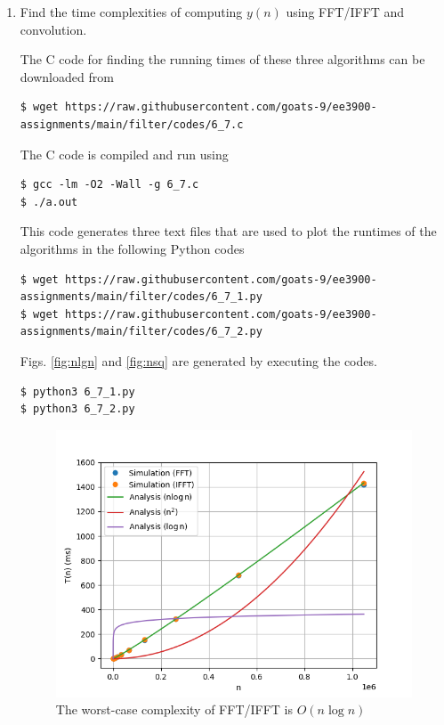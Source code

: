 \documentclass[journal,12pt,twocolumn]{IEEEtran}
\renewcommand\thesection{\arabic{section}}
\begin{document}
\begin{enumerate}[label=\thesection.\arabic*]
\item Find the time complexities of computing $y(n)$ using FFT/IFFT and convolution.

\solution The C code for finding the running times of these three algorithms can be downloaded from
\begin{lstlisting}
$ wget https://raw.githubusercontent.com/goats-9/ee3900-assignments/main/filter/codes/6_7.c
\end{lstlisting}
The C code is compiled and run using
\begin{lstlisting}
$ gcc -lm -O2 -Wall -g 6_7.c
$ ./a.out
\end{lstlisting}
This code generates three text files that are used to plot the runtimes of the algorithms in the following Python codes
\begin{lstlisting}
$ wget https://raw.githubusercontent.com/goats-9/ee3900-assignments/main/filter/codes/6_7_1.py
$ wget https://raw.githubusercontent.com/goats-9/ee3900-assignments/main/filter/codes/6_7_2.py
\end{lstlisting}
Figs. \eqref{fig:nlgn} and \eqref{fig:nsq} are generated by executing the codes.
\begin{lstlisting}
$ python3 6_7_1.py 
$ python3 6_7_2.py 
\end{lstlisting}

\begin{figure}[!htb]
	\includegraphics[width=\columnwidth]{Figures/Q6/6__7__1.png}
	\caption{The worst-case complexity of FFT/IFFT is $O(n\log{n})$}
	\label{fig:nlgn}
\end{figure}


\end{enumerate}
\end{document}
